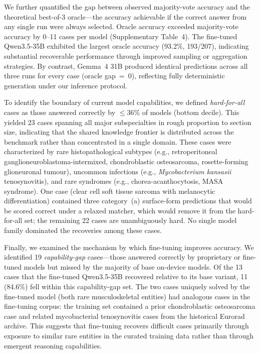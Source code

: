 \documentclass[10pt,journal,compsoc, onecolumn]{IEEEtran}
\begin{document}
We further quantified the gap between observed majority-vote accuracy and the theoretical best-of-3 oracle---the accuracy achievable if the correct answer from any single run were always selected. Oracle accuracy exceeded majority-vote accuracy by 0--11 cases per model (Supplementary Table~4). The fine-tuned Qwen3.5-35B exhibited the largest oracle accuracy (93.2\%, 193/207), indicating substantial recoverable performance through improved sampling or aggregation strategies. By contrast, Gemma~4 31B produced identical predictions across all three runs for every case (oracle gap~=~0), reflecting fully deterministic generation under our inference protocol.

To identify the boundary of current model capabilities, we defined \textit{hard-for-all} cases as those answered correctly by $\leq$36\% of models (bottom decile). This yielded 23 cases spanning all major subspecialties in rough proportion to section size, indicating that the shared knowledge frontier is distributed across the benchmark rather than concentrated in a single domain. These cases were characterized by rare histopathological subtypes (e.g., retroperitoneal ganglioneuroblastoma-intermixed, chondroblastic osteosarcoma, rosette-forming glioneuronal tumour), uncommon infections (e.g., \textit{Mycobacterium kansasii} tenosynovitis), and rare syndromes (e.g., chorea-acanthocytosis, MASA syndrome). One case (clear cell soft tissue sarcoma with melanocytic differentiation) contained three category~(a) surface-form predictions that would be scored correct under a relaxed matcher, which would remove it from the hard-for-all set; the remaining 22 cases are unambiguously hard. No single model family dominated the recoveries among these cases.

Finally, we examined the mechanism by which fine-tuning improves accuracy. We identified 19 \textit{capability-gap} cases---those answered correctly by proprietary or fine-tuned models but missed by the majority of base on-device models. Of the 13 cases that the fine-tuned Qwen3.5-35B recovered relative to its base variant, 11 (84.6\%) fell within this capability-gap set. The two cases uniquely solved by the fine-tuned model (both rare musculoskeletal entities) had analogous cases in the fine-tuning corpus: the training set contained a prior chondroblastic osteosarcoma case and related mycobacterial tenosynovitis cases from the historical Eurorad archive. This suggests that fine-tuning recovers difficult cases primarily through exposure to similar rare entities in the curated training data rather than through emergent reasoning capabilities.
\end{document}
